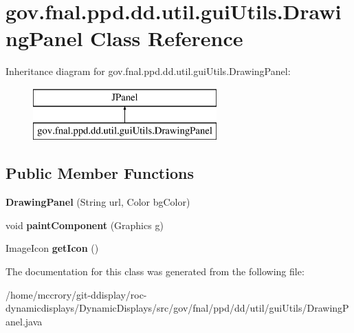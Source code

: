 \hypertarget{classgov_1_1fnal_1_1ppd_1_1dd_1_1util_1_1guiUtils_1_1DrawingPanel}{\section{gov.\-fnal.\-ppd.\-dd.\-util.\-gui\-Utils.\-Drawing\-Panel Class Reference}
\label{classgov_1_1fnal_1_1ppd_1_1dd_1_1util_1_1guiUtils_1_1DrawingPanel}
}
Inheritance diagram for gov.\-fnal.\-ppd.\-dd.\-util.\-gui\-Utils.\-Drawing\-Panel\-:\begin{figure}[H]
\begin{center}
\leavevmode
\includegraphics[height=2.000000cm]{classgov_1_1fnal_1_1ppd_1_1dd_1_1util_1_1guiUtils_1_1DrawingPanel}
\end{center}
\end{figure}
\subsection*{Public Member Functions}
\begin{DoxyCompactItemize}
\item 
\hypertarget{classgov_1_1fnal_1_1ppd_1_1dd_1_1util_1_1guiUtils_1_1DrawingPanel_a1584ddf035e111b02180a19949642966}{{\bfseries Drawing\-Panel} (String url, Color bg\-Color)}\label{classgov_1_1fnal_1_1ppd_1_1dd_1_1util_1_1guiUtils_1_1DrawingPanel_a1584ddf035e111b02180a19949642966}

\item 
\hypertarget{classgov_1_1fnal_1_1ppd_1_1dd_1_1util_1_1guiUtils_1_1DrawingPanel_ad854d2575bc2020948d871306f0d44c0}{void {\bfseries paint\-Component} (Graphics g)}\label{classgov_1_1fnal_1_1ppd_1_1dd_1_1util_1_1guiUtils_1_1DrawingPanel_ad854d2575bc2020948d871306f0d44c0}

\item 
\hypertarget{classgov_1_1fnal_1_1ppd_1_1dd_1_1util_1_1guiUtils_1_1DrawingPanel_ad2f449ee150fda74537d48b529a4467c}{Image\-Icon {\bfseries get\-Icon} ()}\label{classgov_1_1fnal_1_1ppd_1_1dd_1_1util_1_1guiUtils_1_1DrawingPanel_ad2f449ee150fda74537d48b529a4467c}

\end{DoxyCompactItemize}


The documentation for this class was generated from the following file\-:\begin{DoxyCompactItemize}
\item 
/home/mccrory/git-\/ddisplay/roc-\/dynamicdisplays/\-Dynamic\-Displays/src/gov/fnal/ppd/dd/util/gui\-Utils/Drawing\-Panel.\-java\end{DoxyCompactItemize}
